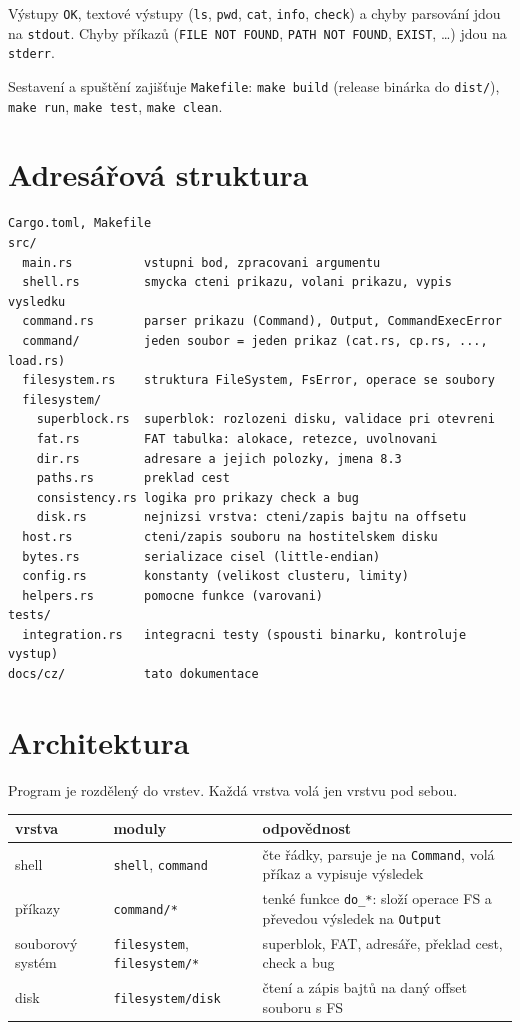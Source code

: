 \documentclass[10pt, a4paper]{report}
\newcommand{\code}[1]{\texttt{#1}}
\begin{document}
	Výstupy \code{OK}, textové výstupy (\code{ls}, \code{pwd}, \code{cat}, \code{info},
	\code{check}) a chyby parsování jdou na \code{stdout}. Chyby příkazů (\code{FILE NOT FOUND},
	\code{PATH NOT FOUND}, \code{EXIST}, \dots) jdou na \code{stderr}.
	
	Sestavení a spuštění zajišťuje \code{Makefile}: \code{make build} (release binárka do
	\code{dist/}), \code{make run}, \code{make test}, \code{make clean}.
	
	\section{Adresářová struktura}
	
	\begin{lstlisting}
Cargo.toml, Makefile
src/
  main.rs          vstupni bod, zpracovani argumentu
  shell.rs         smycka cteni prikazu, volani prikazu, vypis vysledku
  command.rs       parser prikazu (Command), Output, CommandExecError
  command/         jeden soubor = jeden prikaz (cat.rs, cp.rs, ..., load.rs)
  filesystem.rs    struktura FileSystem, FsError, operace se soubory
  filesystem/
    superblock.rs  superblok: rozlozeni disku, validace pri otevreni
    fat.rs         FAT tabulka: alokace, retezce, uvolnovani
    dir.rs         adresare a jejich polozky, jmena 8.3
    paths.rs       preklad cest
    consistency.rs logika pro prikazy check a bug
    disk.rs        nejnizsi vrstva: cteni/zapis bajtu na offsetu
  host.rs          cteni/zapis souboru na hostitelskem disku
  bytes.rs         serializace cisel (little-endian)
  config.rs        konstanty (velikost clusteru, limity)
  helpers.rs       pomocne funkce (varovani)
tests/
  integration.rs   integracni testy (spousti binarku, kontroluje vystup)
docs/cz/           tato dokumentace
	\end{lstlisting}
	
	\section{Architektura}
	
	Program je rozdělený do vrstev. Každá vrstva volá jen vrstvu pod sebou.
	
	\begin{table}[H]
		\centering
		\begin{tabular}{|l|l|p{6.2cm}|}
			\hline
			\textbf{vrstva} & \textbf{moduly} & \textbf{odpovědnost} \\ \hline
			shell & \code{shell}, \code{command} & čte řádky, parsuje je na \code{Command}, volá příkaz a vypisuje výsledek \\ \hline
			příkazy & \code{command/*} & tenké funkce \code{do\_*}: složí operace FS a převedou výsledek na \code{Output} \\ \hline
			souborový systém & \code{filesystem}, \code{filesystem/*} & superblok, FAT, adresáře, překlad cest, check a bug \\ \hline
			disk & \code{filesystem/disk} & čtení a zápis bajtů na daný offset souboru s FS \\ \hline
		\end{tabular}
	\end{table}
	
\end{document}
